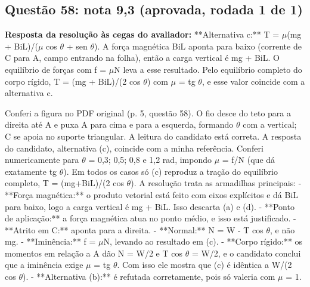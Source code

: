 \documentclass{article}%
\begin{document}
\subsection*{Questão 58: nota 9,3 (aprovada, rodada 1 de 1)}%
\textbf{Resposta da resolução às cegas do avaliador:} **Alternativa c:** T = $\mu$(mg + BiL)/($\mu$ cos $\theta$ + sen $\theta$).\newline%
\newline%
A força magnética BiL aponta para baixo (corrente de C para A, campo entrando na folha), então a carga vertical é mg + BiL. O equilíbrio de forças com f = $\mu$N leva a esse resultado. Pelo equilíbrio completo do corpo rígido, T = (mg + BiL)/(2 cos $\theta$) com $\mu$ = tg $\theta$, e esse valor coincide com a alternativa c.\par %
Conferi a figura no PDF original (p. 5, questão 58). O fio desce do teto para a direita até A e puxa A para cima e para a esquerda, formando $\theta$ com a vertical; C se apoia no suporte triangular. A leitura do candidato está correta.\newline%
\newline%
A resposta do candidato, alternativa (c), coincide com a minha referência. Conferi numericamente para $\theta$ = 0,3; 0,5; 0,8 e 1,2 rad, impondo $\mu$ = f/N (que dá exatamente tg $\theta$). Em todos os casos só (c) reproduz a tração do equilíbrio completo, T = (mg+BiL)/(2 cos $\theta$).\newline%
\newline%
A resolução trata as armadilhas principais:\newline%
{-} **Força magnética:** o produto vetorial está feito com eixos explícitos e dá BiL para baixo, logo a carga vertical é mg + BiL. Isso descarta (a) e (d).\newline%
{-} **Ponto de aplicação:** a força magnética atua no ponto médio, e isso está justificado.\newline%
{-} **Atrito em C:** aponta para a direita.\newline%
{-} **Normal:** N = W - T cos $\theta$, e não mg.\newline%
{-} **Iminência:** f = $\mu$N, levando ao resultado em (c).\newline%
{-} **Corpo rígido:** os momentos em relação a A dão N = W/2 e T cos $\theta$ = W/2, e o candidato conclui que a iminência exige $\mu$ = tg $\theta$. Com isso ele mostra que (c) é idêntica a W/(2 cos $\theta$).\newline%
{-} **Alternativa (b):** é refutada corretamente, pois só valeria com $\mu$ = 1.\newline%
\end{document}
